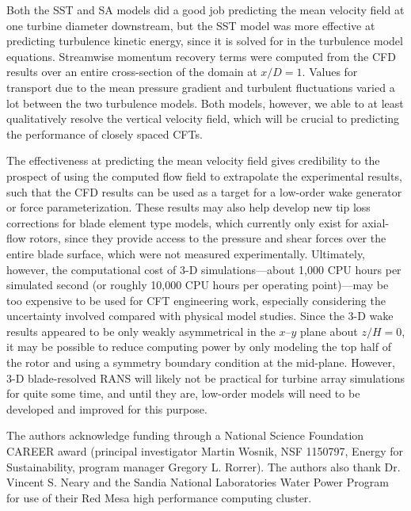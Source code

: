 \documentclass[aip,graphicx]{revtex4-1}
\begin{document}
Both the SST and SA models did a good job predicting the mean velocity field at
one turbine diameter downstream, but the SST model was more effective at
predicting turbulence kinetic energy, since it is solved for in the turbulence
model equations. Streamwise momentum recovery terms were computed from the CFD
results over an entire cross-section of the domain at $x/D=1$. Values for
transport due to the mean pressure gradient and turbulent fluctuations varied a
lot between the two turbulence models. Both models, however, we able to at least
qualitatively resolve the vertical velocity field, which will be crucial to
predicting the performance of closely spaced CFTs.

The effectiveness at predicting the mean velocity field gives credibility to the
prospect of using the computed flow field to extrapolate the experimental
results, such that the CFD results can be used as a target for a low-order wake
generator or force parameterization. These results may also help develop new tip
loss corrections for blade element type models, which currently only exist for
axial-flow rotors, since they provide access to the pressure and shear forces
over the entire blade surface, which were not measured experimentally.
Ultimately, however, the computational cost of 3-D simulations---about 1,000 CPU
hours per simulated second (or roughly 10,000 CPU hours per operating
point)---may be too expensive to be used for CFT engineering work, especially
considering the uncertainty involved compared with physical model studies. Since
the 3-D wake results appeared to be only weakly asymmetrical in the $x$--$y$
plane about $z/H=0$, it may be possible to reduce computing power by only
modeling the top half of the rotor and using a symmetry boundary condition at
the mid-plane. However, 3-D blade-resolved RANS will likely not be practical for
turbine array simulations for quite some time, and until they are, low-order
models will need to be developed and improved for this purpose.


\begin{acknowledgments}
    The authors acknowledge funding through a National Science Foundation CAREER
    award (principal investigator Martin Wosnik, NSF 1150797, Energy for
    Sustainability, program manager Gregory L. Rorrer). The authors also thank
    Dr. Vincent S. Neary and the Sandia National Laboratories Water Power
    Program for use of their Red Mesa high performance computing cluster.
\end{acknowledgments}


\end{document}
